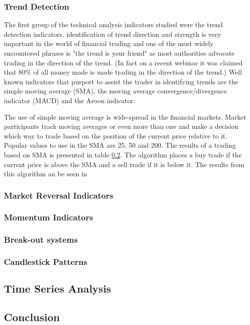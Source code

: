 \subsubsection{Trend Detection}
The first group of the technical analysis indicators studied were the trend detection indicators. identification of trend direction and strength is very important in the world of financial trading and one of the most widely encountered phrases is "the trend is your friend" as most authorities advocate trading in the direction of the trend. (In fact on a recent webinar it was claimed that 80\% of all money made is made trading in the direction of the trend.)  Well known indicators that purport to assist the trader in identifying trends are the simple moving average (SMA), the moving average convergence/divergence indicator (MACD) and the Aroon indicator.

The use of simple moving average is wide-spread in the financial markets. Market participants track moving averages or even more than one and make a decision which way to trade based on the position of the current price relative to it. Popular values to use in the SMA are 25, 50 and 200. The results of a trading based on SMA is presented in table \ref{}. The algorithm places a buy trade if the current price is above the SMA and a sell trade if it is below it. The results from this algorithm an be seen in 

\subsubsection{Market Reversal Indicators}


\subsubsection{Momentum Indicators}

\subsubsection{Break-out systems}


\subsubsection{Candlestick Patterns}


\subsection{Time Series Analysis}



\subsection{Conclusion}



